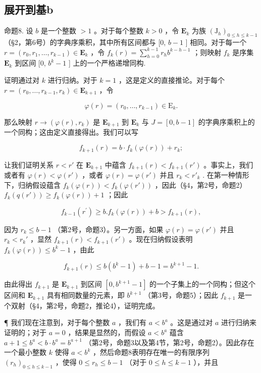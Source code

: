 \subsection{展开到基b}

命题8. 设 \(b\) 是一个整数 \(> 1\) 。对于每个整数 \(k > 0\) ，令 \(\mathbf{E}_k\) 为族 \((\mathrm{J}_h)_{0 \leqslant h \leqslant k-1}\) （§2，第6号）的字典序乘积，其中所有区间都与 {[}0, \(b - 1\) {]} 相同。对于每一个 \(r = (r_0, r_1, \ldots, r_{k-1}) \in \mathbf{E}_k\) ，令 \(f_k(r) = \sum_{h=0}^{k-1} r_h b^{k-h-1}\) ；则映射 \(f_k\) 是序集 \(\mathbf{E}_k\) 到区间 {[}0, \(b^k - 1\) {]} 上的一个严格递增同构.

证明通过对 \(k\) 进行归纳。对于 \(k = 1\) ，这是定义的直接推论。对于每个 \(r = (r_0, \ldots, r_{k-1}, r_k) \in \mathbf{E}_{k+1}\) ，令

\[
\varphi (r) = \left(r _ {0}, \dots , r _ {k - 1}\right) \in \mathrm{E} _ {k}.
\]

那么映射 \(r \to (\varphi(r), r_k)\) 是 \(\mathbf{E}_{k+1}\) 到 \(\mathbf{E}_k\) 与 \(J = [0, b - 1]\) 的字典序乘积上的一个同构；这由定义直接得出。我们可以写

\[
f _ {k + 1} (r) = b \cdot f _ {k} (\varphi (r)) + r _ {k};
\]

让我们证明关系 \(r < r'\) 在 \(\mathbf{E}_{k+1}\) 中蕴含 \(f_{k+1}(r) < f_{k+1}(r')\) 。事实上，我们或者有 \(\varphi(r) < \varphi(r')\) ，或者 \(\varphi(r) = \varphi(r')\) 并且 \(r_k < r'_k\) . 在第一种情形下，归纳假设蕴含 \(f_k(\varphi(r)) < f_k(\varphi(r'))\) ，因此（§4，第2号，命题2） \(f_k(q(r')) \geqslant f_k(\varphi(r)) + 1\) ；因此

\[
f _ {k - 1} (r ^ {\prime}) \geqslant b. f _ {k} (\varphi (r)) + b > f _ {k + 1} (r),
\]

因为 \(r_k \leqslant b - 1\) （第2号，命题3）。另一方面，如果 \(\varphi(r) = \varphi(r')\) 并且 \(r_k < r_k'\) ，显然 \(f_{k+1}(r) < f_{k+1}(r')\) 。现在归纳假设表明 \(f_k(\varphi(r)) \leqslant b^k - 1\) ，由此

\[
f _ {k + 1} (r) \leqslant b (b ^ {k} - 1) + b - 1 = b ^ {k + 1} - 1.
\]

由此得出 \(f_{k+1}\) 是 \(\mathbf{E}_{k+1}\) 到区间 \([0, b^{k+1} - 1]\) 的一个子集上的一个同构；但这个区间和 \(\mathbf{E}_{k+1}\) 具有相同数量的元素，即 \(b^{k+1}\) （第3号，命题5）；因此 \(f_{k+1}\) 是一个双射（§4，第2号，命题2，推论4），证明完成。

¶ 我们现在注意到，对于每个整数 \(a\) ，我们有 \(a < b^a\) 。这是通过对 \(a\) 进行归纳来证明的；对于 \(a = 0\) ，结果是显然的，而假设 \(a < b^a\) 蕴含 \(a + 1 \leqslant b^a < b \cdot b^a = b^{a+1}\) （第2号，命题3以及第4节，第2号，命题2）。因此存在一个最小整数 \(k\) 使得 \(a < b^k\) ，然后命题8表明存在唯一的有限序列 \((r_h)_{0 \leqslant h \leqslant k-1}\) ，使得 \(0 \leqslant r_h \leqslant b - 1\) （对于 \(0 \leqslant h \leqslant k - 1\) ），并且

